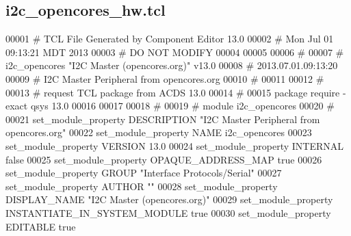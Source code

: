 \subsection{i2c\+\_\+opencores\+\_\+hw.\+tcl}
\label{i2c__opencores__hw_8tcl_source}

\begin{DoxyCode}
00001 \textcolor{comment}{# TCL File Generated by Component Editor 13.0}
00002 \textcolor{comment}{}\textcolor{comment}{# Mon Jul 01 09:13:21 MDT 2013}
00003 \textcolor{comment}{}\textcolor{comment}{# DO NOT MODIFY}
00004 \textcolor{comment}{}
00005 
00006 \textcolor{comment}{# }
00007 \textcolor{comment}{}\textcolor{comment}{# i2c\_opencores "I2C Master (opencores.org)" v13.0}
00008 \textcolor{comment}{}\textcolor{comment}{#  2013.07.01.09:13:20}
00009 \textcolor{comment}{}\textcolor{comment}{# I2C Master Peripheral from opencores.org}
00010 \textcolor{comment}{}\textcolor{comment}{# }
00011 \textcolor{comment}{}
00012 \textcolor{comment}{# }
00013 \textcolor{comment}{}\textcolor{comment}{# request TCL package from ACDS 13.0}
00014 \textcolor{comment}{}\textcolor{comment}{# }
00015 \textcolor{comment}{}\textcolor{keyword}{package} require -exact qsys 13.0\textcolor{comment}{}
00016 \textcolor{comment}{}
00017 
00018 \textcolor{comment}{# }
00019 \textcolor{comment}{}\textcolor{comment}{# module i2c\_opencores}
00020 \textcolor{comment}{}\textcolor{comment}{# }
00021 \textcolor{comment}{}set\_module\_property DESCRIPTION "I2C Master Peripheral from opencores.org"\textcolor{comment}{}
00022 \textcolor{comment}{}set\_module\_property NAME i2c\_opencores\textcolor{comment}{}
00023 \textcolor{comment}{}set\_module\_property VERSION 13.0\textcolor{comment}{}
00024 \textcolor{comment}{}set\_module\_property INTERNAL false\textcolor{comment}{}
00025 \textcolor{comment}{}set\_module\_property OPAQUE\_ADDRESS\_MAP true\textcolor{comment}{}
00026 \textcolor{comment}{}set\_module\_property GROUP "Interface Protocols/Serial"\textcolor{comment}{}
00027 \textcolor{comment}{}set\_module\_property AUTHOR ""\textcolor{comment}{}
00028 \textcolor{comment}{}set\_module\_property DISPLAY\_NAME "I2C Master (opencores.org)"\textcolor{comment}{}
00029 \textcolor{comment}{}set\_module\_property INSTANTIATE\_IN\_SYSTEM\_MODULE true\textcolor{comment}{}
00030 \textcolor{comment}{}set\_module\_property EDITABLE true\textcolor{comment}{}

\end{DoxyCode}
